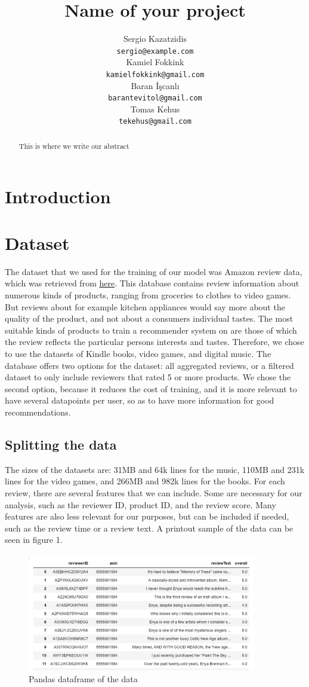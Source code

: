 \documentclass[11pt]{article}
\title{Name of your project}
\author{Sergio Kazatzidis \\
    {\tt sergio@example.com} \\
    Kamiel Fokkink \\
    {\tt kamielfokkink@gmail.com} \\\And
    Baran İşcanlı \\
    {\tt barantevitol@gmail.com} \\
    Tomas Kehus \\
    {\tt tekehus@gmail.com}}
\date{}
\begin{document}
\maketitle
\begin{abstract}
    This is where we write our abstract
\end{abstract}

\noindent

\section{Introduction}

\section{Dataset}
The dataset that we used for the training of our model was Amazon review data, which was retrieved from \href{http://jmcauley.ucsd.edu/data/amazon/}{here}. This database contains review information about numerous kinds of products, ranging from groceries to clothes to video games. But reviews about for example kitchen appliances would say more about the quality of the product, and not about a consumers individual tastes. The most suitable kinds of products to train a recommender system on are those of which the review reflects the particular persons interests and tastes. Therefore, we chose to use the datasets of Kindle books, video games, and digital music. The database offers two options for the dataset: all aggregated reviews, or a filtered dataset to only include reviewers that rated 5 or more products. We chose the second option, because it reduces the cost of training, and it is more relevant to have several datapoints per user, so as to have more information for good recommendations. \\

\subsection{Splitting the data}
The sizes of the datasets are: 31MB and 64k lines for the music, 110MB and 231k lines for the video games, and 266MB and 982k lines for the books. For each review, there are several features that we can include. Some are necessary for our analysis, such as the reviewer ID, product ID, and the review score. Many features are also less relevant for our purposes, but can be included if needed, such as the review time or a review text. A printout sample of the data can be seen in figure 1. \\
\begin{figure}
    \includegraphics[width=10cm]{Pandas_df_example.png}
    \caption{Pandas dataframe of the data}
\end{figure}
\end{document}
